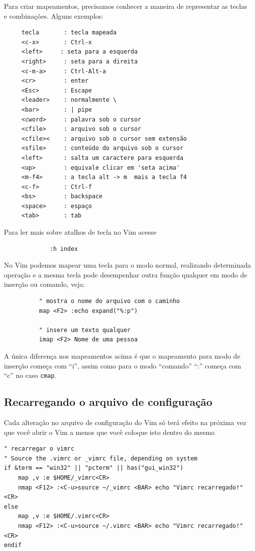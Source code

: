 \documentclass[10pt,a4paper,openany]{book}
\begin{document}
Para criar mapeamentos, precisamos conhecer a maneira de representar
as teclas e combinações. Alguns exemplos:

\begin{verbatim}
	 tecla       : tecla mapeada
	 <c-x>       : Ctrl-x
	 <left>	    : seta para a esquerda
	 <right>     : seta para a direita
	 <c-m-a>     : Ctrl-Alt-a
	 <cr>        : enter
	 <Esc>       : Escape
	 <leader>    : normalmente \
	 <bar>       : | pipe
	 <cword>     : palavra sob o cursor
	 <cfile>     : arquivo sob o cursor
	 <cfile><    : arquivo sob o cursor sem extensão
	 <sfile>     : conteúdo do arquivo sob o cursor
	 <left>      : salta um caractere para esquerda
	 <up>        : equivale clicar em 'seta acima'
	 <m-f4>      : a tecla alt -> m  mais a tecla f4
	 <c-f>       : Ctrl-f
	 <bs>        : backspace
	 <space>     : espaço
	 <tab>       : tab
\end{verbatim}

Para ler mais sobre atalhos de tecla no Vim acesse 

\begin{verbatim}
             :h index
\end{verbatim}

No Vim podemos mapear uma tecla para o modo normal, realizando
determinada operação e a mesma tecla pode desempenhar outra função
qualquer em modo de inserção ou comando, veja:

\begin{verbatim}
		  " mostra o nome do arquivo com o caminho
		  map <F2> :echo expand("%:p")

		  " insere um texto qualquer
		  imap <F2> Nome de uma pessoa
\end{verbatim}

A única diferença nos mapeamentos acima é que o mapeamento para modo
de inserção começa com ``i'', assim como para o modo ``comando'' ``:'' começa
com ``c'' no caso \verb|cmap|.

\subsection{Recarregando o arquivo de configuração}
\label{sec:Recarregando o arquivo de configuração}

Cada alteração no arquivo de configuração do Vim só terá efeito na próxima vez que você
abrir o Vim a menos que você coloque isto dentro do mesmo

\begin{verbatim}
" recarregar o vimrc
" Source the .vimrc or _vimrc file, depending on system
if &term == "win32" || "pcterm" || has("gui_win32")
	map ,v :e $HOME/_vimrc<CR>
	nmap <F12> :<C-u>source ~/_vimrc <BAR> echo "Vimrc recarregado!"<CR>
else
	map ,v :e $HOME/.vimrc<CR>
	nmap <F12> :<C-u>source ~/.vimrc <BAR> echo "Vimrc recarregado!"<CR>
endif
\end{verbatim}
\end{document}
